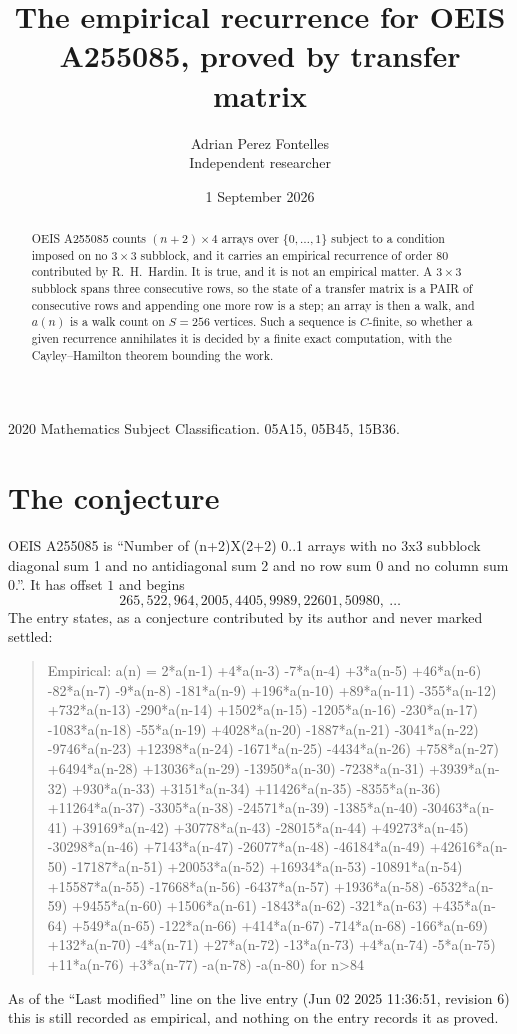 \documentclass[11pt,a4paper]{article}
\title{The empirical recurrence for OEIS A255085, proved by transfer matrix}
\author{Adrian Perez Fontelles\\ \small Independent researcher}
\date{1 September 2026}
\theoremstyle{plain}
\theoremstyle{definition}
\begin{document}
\maketitle

\begin{abstract}
OEIS A255085 counts $(n+2)\times4$ arrays over $\{0,\dots,1\}$ subject to a condition imposed on
no $3\times3$ subblock, and it carries an empirical recurrence of order $80$
contributed by R.~H.~Hardin. It is true, and it is not an empirical matter. A $3\times3$
subblock spans three consecutive rows, so the state of a transfer matrix is a PAIR of
consecutive rows and appending one more row is a step; an array is then a walk, and
$a(n)$ is a walk count on $S=256$ vertices. Such a sequence is $C$-finite, so whether a given
recurrence annihilates it is decided by a finite exact computation, with the Cayley--Hamilton
theorem bounding the work.
\end{abstract}

\noindent\small 2020 Mathematics Subject Classification. 05A15, 05B45, 15B36.\normalsize

\section{The conjecture}

OEIS A255085 is ``Number of (n+2)X(2+2) 0..1 arrays with no 3x3 subblock diagonal sum 1 and no antidiagonal sum 2 and no row sum 0 and no column sum 0.''. It has offset $1$ and begins
\[
265, 522, 964, 2005, 4405, 9989, 22601, 50980,\ \dots
\]
The entry states, as a conjecture contributed by its author and never marked settled:
\begin{quote}
Empirical: a(n) = 2*a(n-1) +4*a(n-3) -7*a(n-4) +3*a(n-5) +46*a(n-6) -82*a(n-7) -9*a(n-8) -181*a(n-9) +196*a(n-10) +89*a(n-11) -355*a(n-12) +732*a(n-13) -290*a(n-14) +1502*a(n-15) -1205*a(n-16) -230*a(n-17) -1083*a(n-18) -55*a(n-19) +4028*a(n-20) -1887*a(n-21) -3041*a(n-22) -9746*a(n-23) +12398*a(n-24) -1671*a(n-25) -4434*a(n-26) +758*a(n-27) +6494*a(n-28) +13036*a(n-29) -13950*a(n-30) -7238*a(n-31) +3939*a(n-32) +930*a(n-33) +3151*a(n-34) +11426*a(n-35) -8355*a(n-36) +11264*a(n-37) -3305*a(n-38) -24571*a(n-39) -1385*a(n-40) -30463*a(n-41) +39169*a(n-42) +30778*a(n-43) -28015*a(n-44) +49273*a(n-45) -30298*a(n-46) +7143*a(n-47) -26077*a(n-48) -46184*a(n-49) +42616*a(n-50) -17187*a(n-51) +20053*a(n-52) +16934*a(n-53) -10891*a(n-54) +15587*a(n-55) -17668*a(n-56) -6437*a(n-57) +1936*a(n-58) -6532*a(n-59) +9455*a(n-60) +1506*a(n-61) -1843*a(n-62) -321*a(n-63) +435*a(n-64) +549*a(n-65) -122*a(n-66) +414*a(n-67) -714*a(n-68) -166*a(n-69) +132*a(n-70) -4*a(n-71) +27*a(n-72) -13*a(n-73) +4*a(n-74) -5*a(n-75) +11*a(n-76) +3*a(n-77) -a(n-78) -a(n-80) for n>84
\end{quote}
As of the ``Last modified'' line on the live entry (Jun 02 2025 11:36:51, revision 6) this is still
recorded as empirical, and nothing on the entry records it as proved.
\end{document}
